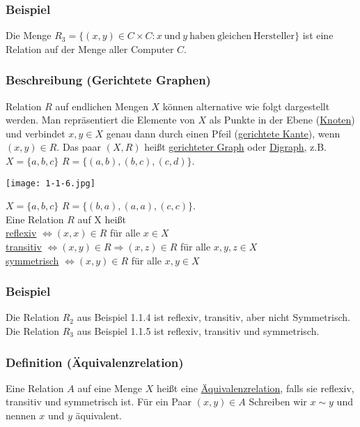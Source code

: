 \subsubsection{Beispiel}
Die Menge $R_3=\{(x,y)\in C\times C:x\ \mathrm{und\ } y \mathrm{\ haben\ gleichen\ Hersteller}\}$ ist eine Relation auf der Menge aller Computer $C$.
\subsubsection{Beschreibung (Gerichtete Graphen)}
Relation $R$ auf endlichen Mengen $X$ können alternative wie folgt dargestellt werden.  Man repr\"{a}sen\-tiert die Elemente von $X$ als Punkte in der Ebene (\underline{Knoten}) und verbindet $x,y\in X$ genau dann durch einen Pfeil (\underline{gerichtete Kante}), wenn $(x,y)\in R$.  Das paar $(X,R)$ heißt \underline{gerichteter Graph} oder \underline{Digraph}, z.B. $X=\{a,b,c\}$ $R=\{(a,b),(b,c),(c,d)\}$.\\
\begin{center}
\texttt{[image: 1-1-6.jpg]}
\end{center}
$X=\{a,b,c\}$ $R=\{(b,a),(a,a),(c,c)\}$. \\
Eine Relation $R$ auf X heißt \\
\underline{reflexiv} $\Leftrightarrow (x,x)\in R$ für alle $x\in X$ \\
\underline{transitiv} $\Leftrightarrow (x,y)\in R \Rightarrow (x,z) \in R$ für alle $x,y,z\in X$\\
\underline{symmetrisch} $\Leftrightarrow (x,y)\in R$ für alle $x,y\in X$
\subsubsection{Beispiel}
Die Relation $R_2$ aus Beispiel 1.1.4 ist reflexiv, transitiv, aber nicht Symmetrisch.  Die Relation $R_3$ aus Beispiel 1.1.5 ist reflexiv, transitiv und symmetrisch.
\subsubsection{Definition (\"{A}quivalenzrelation)}
Eine Relation $A$ auf eine Menge $X$ heißt eine \underline{\"{A}quivalenzrelation}, falls sie reflexiv, transitiv und symmetrisch ist.  F\"{u}r ein Paar $(x,y)\in A$  Schreiben wir $x\mathtt{\sim} y$ und nennen $x$ und $y$ \"{a}quivalent.
